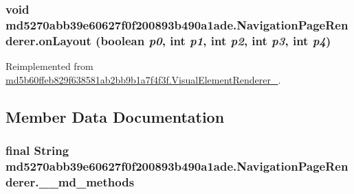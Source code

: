\hypertarget{classmd5270abb39e60627f0f200893b490a1ade_1_1_navigation_page_renderer_4a98b6254362130c58ffc36a0a18744a}{
\subsubsection[{onLayout}]{\setlength{\rightskip}{0pt plus 5cm}void md5270abb39e60627f0f200893b490a1ade.NavigationPageRenderer.onLayout (boolean {\em p0}, \/  int {\em p1}, \/  int {\em p2}, \/  int {\em p3}, \/  int {\em p4})}}
\label{classmd5270abb39e60627f0f200893b490a1ade_1_1_navigation_page_renderer_4a98b6254362130c58ffc36a0a18744a}




Reimplemented from \hyperlink{classmd5b60ffeb829f638581ab2bb9b1a7f4f3f_1_1_visual_element_renderer__1_8c7af843aeec04827cb3a3981ea1978d}{md5b60ffeb829f638581ab2bb9b1a7f4f3f.VisualElementRenderer\_}.

\subsection{Member Data Documentation}
\hypertarget{classmd5270abb39e60627f0f200893b490a1ade_1_1_navigation_page_renderer_f9b71b148669bb50bafafc240c856788}{
\subsubsection[{\_\-\_\-md\_\-methods}]{\setlength{\rightskip}{0pt plus 5cm}final String {\bf md5270abb39e60627f0f200893b490a1ade.NavigationPageRenderer.\_\-\_\-md\_\-methods}}}
\label{classmd5270abb39e60627f0f200893b490a1ade_1_1_navigation_page_renderer_f9b71b148669bb50bafafc240c856788}




